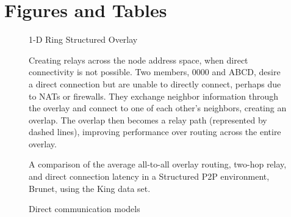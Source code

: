 \section{Figures and Tables}

\begin{figure}[ht]
\centering
{}
\caption{1-D Ring Structured Overlay}
\label{fig:ring_overlay}
\end{figure}

\begin{figure}[ht]
\centering
{}
\caption[Proactive relay creation]{Creating relays across the node address
space, when direct connectivity is not possible.  Two members, 0000 and ABCD, 
desire a direct connection but are unable to directly connect, perhaps due to
NATs or firewalls.  They exchange neighbor information through the overlay and
connect to one of each other's neighbors, creating an overlap.  The overlap
then becomes a relay path (represented by dashed lines), improving performance
over routing across the entire overlay.}
\label{fig:relay}
\end{figure}

\begin{figure}[ht]
\centering
{}
\caption[Relay evaluation]{A comparison of the average all-to-all overlay
routing, two-hop relay, and direct connection latency in a Structured P2P
environment, Brunet, using the King data set.}
\label{fig:simulated_relays}
\end{figure}

\begin{figure}[ht]
\centering
\caption{Direct communication models}
\label{fig:direct_communication}
\end{figure}

\begin{table}[ht]
\caption{VN Stack Comparison}
\label{tab:vpn_eval_comp}
\centering
\end{table}

